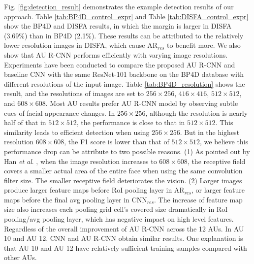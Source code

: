 \documentclass[5p,twocolumn]{elsarticle}
\newcommand{\etal}{\textit{et al}. }
\begin{document}
Fig. \ref{fig:detection_result} demonstrates the example detection results of our approach.
Table \ref{tab:BP4D_control_expr} and Table \ref{tab:DISFA_control_expr} show the BP4D and DISFA results, in which the margin is larger in DISFA (3.69\%) than in BP4D (2.1\%). These results can be attributed to the relatively lower resolution images in DISFA, which cause AR$_{res}$ to benefit more.
We also show that AU R-CNN performs efficiently with varying image resolutions. Experiments have been conducted to compare the proposed AU R-CNN and baseline CNN with the same ResNet-101 backbone on the BP4D database with different resolutions of the input image. Table \ref{tab:BP4D_resolution} shows the result, and the resolutions of images are set to $256\times 256$, $416 \times 416$, $512 \times 512$, and $608 \times 608$. Most AU results prefer AU R-CNN model by observing subtle cues of facial appearance changes. In $256 \times 256$, although the resolution is nearly half of that in $512 \times 512$, the performance is close to that in $512 \times 512$. This similarity leads to efficient detection when using $256 \times 256$. But in the highest resolution $608 \times 608$, the F1 score is lower than that of $512 \times 512$, we believe this performance drop can be attribute to two possible reasons. (1)
As pointed out by Han \etal \cite{han2017optimizing}, when the image resolution increases to $608 \times 608$, the receptive field covers a smaller actual area of the entire face when using the same convolution filter size. The smaller receptive field deteriorates the vision. (2) Larger images produce larger feature maps before RoI pooling layer in AR$_{res}$, or larger feature maps before the final avg pooling layer in CNN$_{res}$. The increase of feature map size also increases each pooling grid cell's covered size dramatically in RoI pooling/avg pooling layer, which has negative impact on high level features. Regardless of the overall improvement of AU R-CNN across the 12 AUs. In AU 10 and AU 12, CNN and AU R-CNN obtain similar results. One explanation is that AU 10 and AU 12 have relatively sufficient training samples compared with other AUs.
\end{document}
